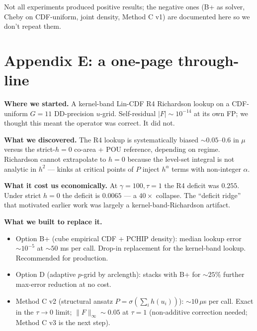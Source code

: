 \documentclass[11pt]{article}
\begin{document}
Not all experiments produced positive results; the negative ones (B+
as solver, Cheby on CDF-uniform, joint density, Method C v1) are
documented here so we don't repeat them.

\section{Appendix E: a one-page through-line}

\textbf{Where we started.} A kernel-band Lin-CDF R4 Richardson lookup
on a CDF-uniform $G{=}11$ DD-precision $u$-grid. Self-residual
$|F| \sim 10^{-14}$ at its own FP; we thought this meant the operator
was correct. It did not.

\textbf{What we discovered.} The R4 lookup is systematically biased
$\sim 0.05$--$0.6$ in $\mu$ versus the strict-$h{=}0$ co-area + POU
reference, depending on regime. Richardson cannot extrapolate to
$h = 0$ because the level-set integral is not analytic in $h^2$ ---
kinks at critical points of $P$ inject $h^\alpha$ terms with
non-integer $\alpha$.

\textbf{What it cost us economically.} At $\gamma = 100, \tau = 1$
the R4 deficit was $0.255$. Under strict $h = 0$ the deficit is
$0.0065$ --- a $40{\times}$ collapse. The ``deficit ridge'' that
motivated earlier work was largely a kernel-band-Richardson artifact.

\textbf{What we built to replace it.}
\begin{itemize}\itemsep1pt
  \item Option B+ (cube empirical CDF + PCHIP density): median lookup
        error $\sim 10^{-5}$ at $\sim 50$ ms per call. Drop-in
        replacement for the kernel-band lookup. Recommended for
        production.
  \item Option D (adaptive $p$-grid by arclength): stacks with B+ for
        $\sim 25\%$ further max-error reduction at no cost.
  \item Method C v2 (structural ansatz $P = \sigma(\sum_i h(u_i))$):
        $\sim 10\,\mu$s per call. Exact in the $\tau \to 0$ limit;
        $\|F\|_\infty \sim 0.05$ at $\tau = 1$ (non-additive correction
        needed; Method C v3 is the next step).
\end{itemize}
\end{document}
